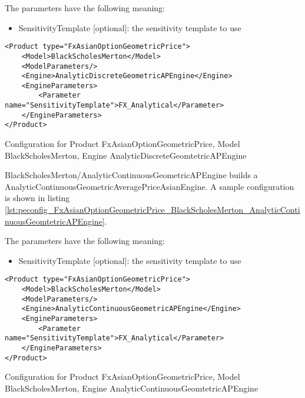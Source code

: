 The parameters have the following meaning:

\begin{itemize}
\item SensitivityTemplate [optional]: the sensitivity template to use 
\end{itemize}

\begin{longlisting}
\begin{verbatim}
<Product type="FxAsianOptionGeometricPrice">
    <Model>BlackScholesMerton</Model>
    <ModelParameters/>
    <Engine>AnalyticDiscreteGeometricAPEngine</Engine>
    <EngineParameters>
        <Parameter name="SensitivityTemplate">FX_Analytical</Parameter>
    </EngineParameters>
</Product>
\end{verbatim}
\caption{Configuration for Product FxAsianOptionGeometricPrice, Model BlackScholesMerton, Engine AnalyticDiscreteGeomtetricAPEngine}
\label{lst:peconfig_FxAsianOptionGeometricPrice_BlackScholesMerton_AnalyticDiscreteGeomtetricAPEngine}
\end{longlisting}

BlackScholesMerton/AnalyticContinuousGeometricAPEngine builds a AnalyticContinuousGeometricAveragePriceAsianEngine. A sample
configuration is shown in listing
\ref{lst:peconfig_FxAsianOptionGeometricPrice_BlackScholesMerton_AnalyticContinuousGeomtetricAPEngine}.

The parameters have the following meaning:

\begin{itemize}
\item SensitivityTemplate [optional]: the sensitivity template to use 
\end{itemize}

\begin{longlisting}
\begin{verbatim}
<Product type="FxAsianOptionGeometricPrice">
    <Model>BlackScholesMerton</Model>
    <ModelParameters/>
    <Engine>AnalyticContinuousGeometricAPEngine</Engine>
    <EngineParameters>
        <Parameter name="SensitivityTemplate">FX_Analytical</Parameter>
    </EngineParameters>
</Product>
\end{verbatim}
\caption{Configuration for Product FxAsianOptionGeometricPrice, Model BlackScholesMerton, Engine AnalyticContinuousGeomtetricAPEngine}
\label{lst:peconfig_FxAsianOptionGeometricPrice_BlackScholesMerton_AnalyticContinuousGeomtetricAPEngine}
\end{longlisting}

